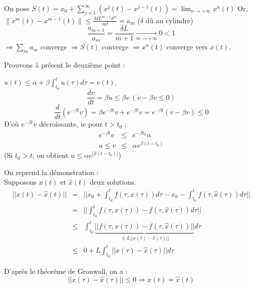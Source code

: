 \begin{dem}
On pose $S(t)=x_0+\sum_{j=1}^{\infty}(x^j(t)-x^{j-1}(t)) = \lim_{n\to +\infty} x^n(t)$
Or, $\|x^m(t)-x^{m-1}(t)\| \leq \frac{ML^{m-1}\delta^m}{m!}=a_m$ ($\delta$ dû au cylindre)
\[\frac{a_{m+1}}{a_m}=\frac{\delta L}{m+1} \xrightarrow[m\to +\infty]{} 0<1\]
$\Rightarrow \sum_m a_m$ converge $\Rightarrow S(t)$ converge $\Rightarrow x^n(t)$ converge vers $x(t)$.

\bigskip
Prouvons à présent le deuxième point :\\

\begin{dem}
	$u(t)\leq\alpha + \beta\int_{t_0}^t u(\tau) d\tau = v(t)$.\\
	\[\frac{dv}{dt}=\beta u \leq \beta v\ (\dot{v}-\beta v \leq 0)\]
	\[\frac{d}{dt}\left( e^{-\beta t} v\right) = \beta e^{-\beta t} v + e^{-\beta t} \dot{v} = e^{-\beta t}(\dot{v}-\beta v) \leq 0\]
	D'où $e^{-\beta t}v$ décroissante, ie pour $t>t_0$ : 
	\begin{eqnarray*}
		e^{-\beta t} v &\leq& e^{-\beta t_0} \alpha \\
		u \leq v &\leq& \alpha e^{\beta(t-t_0)}
	\end{eqnarray*}
	(Si $t_0>t$, on obtient $u\leq \alpha e^{|\beta(t-t_0)|}$)
\end{dem}

On reprend la démonstration : \\
Supposons $x(t)$ et $\hat{x}(t)$ deux solutions.
\begin{eqnarray*}
	||x(t)-\hat{x}(t)||&=&||x_0 + \int_{t_0}^t f(\tau,x(\tau)) d\tau - x_0 - \int_{t_0}^t f(\tau,\hat{x}(\tau)) d\tau ||\\
			   &=&||\int_{t_0}^t f(\tau,x(\tau)) - f(\tau,\hat{x}(\tau)) d\tau ||\\
			&\leq&\int_{t_0}^t \underbrace{||f(\tau,x(\tau)) - f(\tau,\hat{x}(\tau))||}_{\leq L||x(\tau)-\hat{x}(\tau)||} d\tau \\
		        &\leq&0+L\int_{t_0}^t ||x(\tau)-\hat{x}(\tau)|| d\tau
\end{eqnarray*}

D'après le théorème de Gronwall, on a :
\[||x(\tau)-\hat{x}(\tau)||\leq 0 \Rightarrow x(t) = \hat{x}(t)\]
\end{dem}


